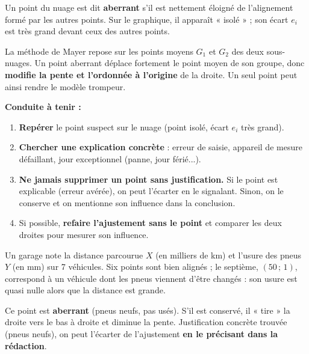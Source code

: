 \documentclass[11pt]{article}
\begin{document}
\begin{definition}
Un point du nuage est dit \textbf{aberrant} s'il est nettement éloigné de l'alignement formé par les autres points. Sur le graphique, il apparaît « isolé » ; son écart $e_i$ est très grand devant ceux des autres points.
\end{definition}

\begin{attention}
La méthode de Mayer repose sur les points moyens $G_1$ et $G_2$ des deux sous-nuages. Un point aberrant déplace fortement le point moyen de son groupe, donc \textbf{modifie la pente et l'ordonnée à l'origine} de la droite. Un seul point peut ainsi rendre le modèle trompeur.
\medskip

\textbf{Conduite à tenir :}
\begin{enumerate}
    \item \textbf{Repérer} le point suspect sur le nuage (point isolé, écart $e_i$ très grand).
    \item \textbf{Chercher une explication concrète} : erreur de saisie, appareil de mesure défaillant, jour exceptionnel (panne, jour férié...).
    \item \textbf{Ne jamais supprimer un point sans justification.} Si le point est explicable (erreur avérée), on peut l'écarter en le signalant. Sinon, on le conserve et on mentionne son influence dans la conclusion.
    \item Si possible, \textbf{refaire l'ajustement sans le point} et comparer les deux droites pour mesurer son influence.
\end{enumerate}
\end{attention}

\begin{exemplebox}
Un garage note la distance parcourue $X$ (en milliers de km) et l'usure des pneus $Y$ (en mm) sur 7 véhicules. Six points sont bien alignés ; le septième, $(50\,;\,1)$, correspond à un véhicule dont les pneus viennent d'être changés : son usure est quasi nulle alors que la distance est grande.
\medskip

Ce point est \textbf{aberrant} (pneus neufs, pas usés). S'il est conservé, il « tire » la droite vers le bas à droite et diminue la pente. Justification concrète trouvée (pneus neufs), on peut l'écarter de l'ajustement \textbf{en le précisant dans la rédaction}.
\end{exemplebox}
\end{document}

